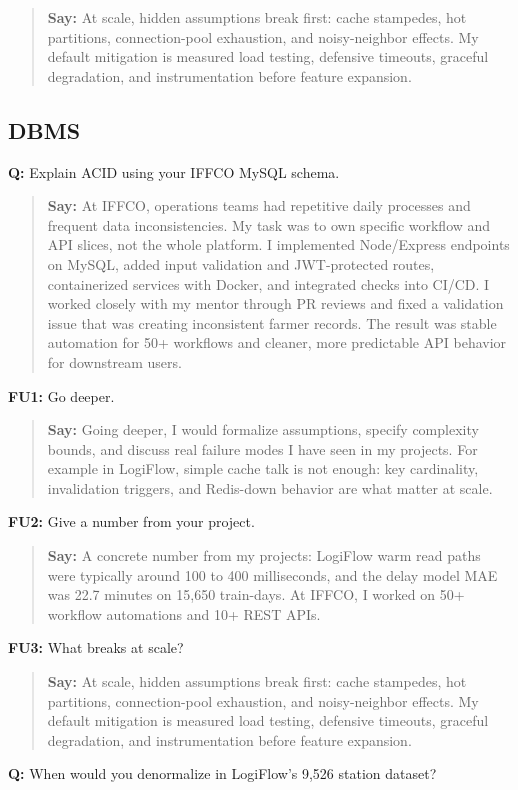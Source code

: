 \documentclass[9pt,a4paper]{article}
\begin{document}
\begin{quote}\small\textbf{Say:} At scale, hidden assumptions break first: cache stampedes, hot partitions, connection-pool exhaustion, and noisy-neighbor effects. My default mitigation is measured load testing, defensive timeouts, graceful degradation, and instrumentation before feature expansion.\end{quote}
\vspace{2mm}
\subsection{DBMS}
\textbf{Q:} Explain ACID using your IFFCO MySQL schema.

\begin{quote}\small\textbf{Say:} At IFFCO, operations teams had repetitive daily processes and frequent data inconsistencies. My task was to own specific workflow and API slices, not the whole platform. I implemented Node/Express endpoints on MySQL, added input validation and JWT-protected routes, containerized services with Docker, and integrated checks into CI/CD. I worked closely with my mentor through PR reviews and fixed a validation issue that was creating inconsistent farmer records. The result was stable automation for 50+ workflows and cleaner, more predictable API behavior for downstream users.\end{quote}
\vspace{2mm}
\textbf{FU1:} Go deeper.

\begin{quote}\small\textbf{Say:} Going deeper, I would formalize assumptions, specify complexity bounds, and discuss real failure modes I have seen in my projects. For example in LogiFlow, simple cache talk is not enough: key cardinality, invalidation triggers, and Redis-down behavior are what matter at scale.\end{quote}
\vspace{2mm}
\textbf{FU2:} Give a number from your project.

\begin{quote}\small\textbf{Say:} A concrete number from my projects: LogiFlow warm read paths were typically around 100 to 400 milliseconds, and the delay model MAE was 22.7 minutes on 15,650 train-days. At IFFCO, I worked on 50+ workflow automations and 10+ REST APIs.\end{quote}
\vspace{2mm}
\textbf{FU3:} What breaks at scale?

\begin{quote}\small\textbf{Say:} At scale, hidden assumptions break first: cache stampedes, hot partitions, connection-pool exhaustion, and noisy-neighbor effects. My default mitigation is measured load testing, defensive timeouts, graceful degradation, and instrumentation before feature expansion.\end{quote}
\vspace{2mm}
\textbf{Q:} When would you denormalize in LogiFlow's 9,526 station dataset?
\end{document}
